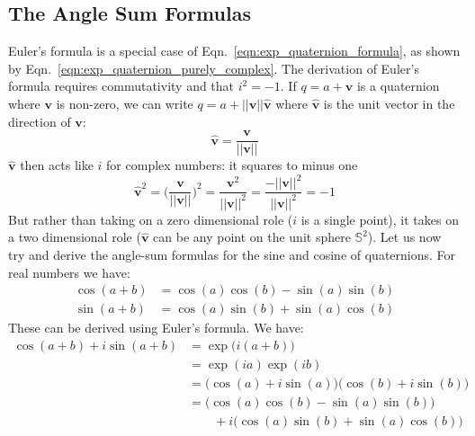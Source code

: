 \documentclass{article}
\begin{document}
        \subsection{The Angle Sum Formulas}
            Euler's formula is a special case of
            Eqn.~\ref{eqn:exp_quaternion_formula}, as shown by
            Eqn.~\ref{eqn:exp_quaternion_purely_complex}. The derivation of
            Euler's formula requires commutativity and that $i^{2}=-1$. If
            $q=a+\mathbf{v}$ is a quaternion where $\mathbf{v}$ is non-zero,
            we can write $q=a+||\mathbf{v}||\hat{\mathbf{v}}$ where
            $\hat{\mathbf{v}}$ is the unit vector in the direction of
            $\mathbf{v}$:
            \begin{equation}
                \hat{\mathbf{v}}=\frac{\mathbf{v}}{||\mathbf{v}||}
            \end{equation}
            $\hat{\mathbf{v}}$ then acts like $i$ for complex numbers: it
            squares to minus one
            \begin{equation}
                \hat{\mathbf{v}}^{2}
                =\Big(\frac{\mathbf{v}}{||\mathbf{v}||}\Big)^{2}
                =\frac{\mathbf{v}^{2}}{||\mathbf{v}||^{2}}
                =\frac{-||\mathbf{v}||^{2}}{||\mathbf{v}||^{2}}
                =-1
            \end{equation}
            But rather than taking on a zero dimensional role
            ($i$ is a single point),
            it takes on a two dimensional role ($\hat{\mathbf{v}}$ can be
            any point on the unit sphere $\mathbb{S}^{2}$). Let us now try and
            derive the angle-sum formulas for the sine and cosine of
            quaternions. For real numbers we have:
            \begin{align}
                \label{eqn:angle_sum_formula_cos}
                \cos(a+b)&=\cos(a)\cos(b)-\sin(a)\sin(b)\\
                \label{eqn:angle_sum_formula_sin}
                \sin(a+b)&=\cos(a)\sin(b)+\sin(a)\cos(b)
            \end{align}
            These can be derived using Euler's formula. We have:
            \begin{align}
                \cos(a+b)+i\sin(a+b)
                &=\exp\big(i(a+b)\big)\\
                &=\exp(ia)\exp(ib)\\
                &=\Big(\cos(a)+i\sin(a)\Big)
                    \Big(\cos(b)+i\sin(b)\Big)\\
                &=\Big(\cos(a)\cos(b)-\sin(a)\sin(b)\Big)\nonumber\\
                &\hspace{2em}
                    +i\Big(\cos(a)\sin(b)+\sin(a)\cos(b)\Big)
            \end{align}
\end{document}

